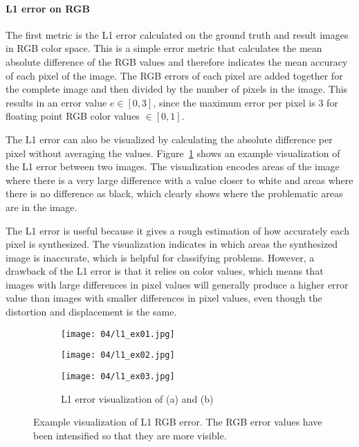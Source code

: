 \paragraph{L1 error on RGB}
The first metric is the L1 error calculated on the ground truth and result images in RGB color space. This is a simple error metric that calculates the mean absolute difference of the RGB values and therefore indicates the mean accuracy of each pixel of the image. The RGB errors of each pixel are added together for the complete image and then divided by the number of pixels in the image. This results in an error value $e \in [0,3]$, since the maximum error per pixel is 3 for floating point RGB color values $\in [0,1]$.

The L1 error can also be visualized by calculating the absolute difference per pixel without averaging the values. Figure~\ref{fig:l1_example} shows an example visualization of the L1 error between two images. The visualization encodes areas of the image where there is a very large difference with a value closer to white and areas where there is no difference as black, which clearly shows where the problematic areas are in the image.

The L1 error is useful because it gives a rough estimation of how accurately each pixel is synthesized. The visualization indicates in which areas the synthesized image is inaccurate, which is helpful for classifying problems. However, a drawback of the L1 error is that it relies on color values, which means that images with large differences in pixel values will generally produce a higher error value than images with smaller differences in pixel values, even though the distortion and displacement is the same. 

\begin{figure}
\centering
    \hfill
    \begin{subfigure}[t]{0.3\textwidth}
            \centering
            \texttt{[image: 04/l1\_ex01.jpg]}
            \caption{}
    \end{subfigure}%
    \hfill
    \begin{subfigure}[t]{0.3\textwidth}
            \centering
            \texttt{[image: 04/l1\_ex02.jpg]}
            \caption{}
    \end{subfigure}
    \hfill
    \begin{subfigure}[t]{0.3\textwidth}
            \centering
            \texttt{[image: 04/l1\_ex03.jpg]}
            \caption{L1 error visualization of (a) and (b)}
    \end{subfigure}%
    \hfill
    \hfill
  \caption[Example visualization of L1 RGB error]{Example visualization of L1 RGB error. The RGB error values have been intensified so that they are more visible.} \label{fig:l1_example}
\end{figure}

